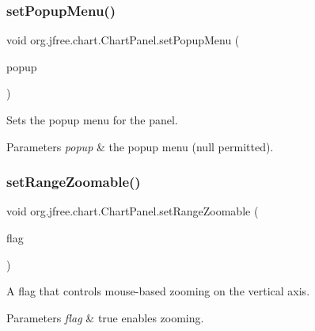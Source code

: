 \subsubsection{\texorpdfstring{set\+Popup\+Menu()}{setPopupMenu()}}
{\footnotesize\ttfamily void org.\+jfree.\+chart.\+Chart\+Panel.\+set\+Popup\+Menu (\begin{DoxyParamCaption}\item[{J\+Popup\+Menu}]{popup }\end{DoxyParamCaption})}

Sets the popup menu for the panel.


\begin{DoxyParams}{Parameters}
{\em popup} & the popup menu ({\ttfamily null} permitted). \\
\hline
\end{DoxyParams}
\mbox{\label{classorg_1_1jfree_1_1chart_1_1_chart_panel_aa8994e9572dccd489e94bd9d2f001da8}} 
\subsubsection{\texorpdfstring{set\+Range\+Zoomable()}{setRangeZoomable()}}
{\footnotesize\ttfamily void org.\+jfree.\+chart.\+Chart\+Panel.\+set\+Range\+Zoomable (\begin{DoxyParamCaption}\item[{boolean}]{flag }\end{DoxyParamCaption})}

A flag that controls mouse-\/based zooming on the vertical axis.


\begin{DoxyParams}{Parameters}
{\em flag} & {\ttfamily true} enables zooming. \\
\hline
\end{DoxyParams}
\mbox{\label{classorg_1_1jfree_1_1chart_1_1_chart_panel_ae9474a574a8bce645f533f4a80ae203a}} 
